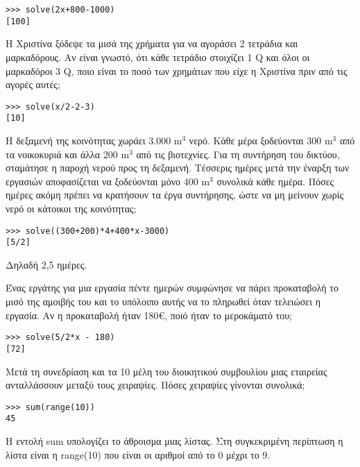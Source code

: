 \begin{lstlisting}
>>> solve(2x+800-1000)
[100]
\end{lstlisting}
\begin{exercise}
Η Χριστίνα ξόδεψε τα μισά της χρήματα για να αγοράσει 2 τετράδια και μαρκαδόρους.
Αν είναι γνωστό, ότι κάθε τετράδιο στοιχίζει 1 Q και όλοι οι μαρκαδόροι 3 Q, ποιο είναι
το ποσό των χρημάτων που είχε η Χριστίνα πριν από τις αγορές αυτές;
\end{exercise}
\begin{lstlisting}
>>> solve(x/2-2-3)
[10]
\end{lstlisting}
\begin{exercise}
Η δεξαμενή της κοινότητας χωράει 3.000 m$^3$ νερό. Κάθε μέρα ξοδεύονται 300 m$^3$ από
τα νοικοκυριά και άλλα 200 m$^3$ από τις βιοτεχνίες. Για τη συντήρηση του δικτύου,
σταμάτησε η παροχή νερού προς τη δεξαμενή. Τέσσερις ημέρες μετά την έναρξη των
εργασιών αποφασίζεται να ξοδεύονται μόνο 400 m$^3$ συνολικά κάθε ημέρα. Πόσες
ημέρες ακόμη πρέπει να κρατήσουν τα έργα συντήρησης, ώστε να μη μείνουν χωρίς
νερό οι κάτοικοι της κοινότητας;
\end{exercise}
\begin{lstlisting}
>>> solve((300+200)*4+400*x-3000)
[5/2]
\end{lstlisting}
Δηλαδή 2,5 ημέρες.
\begin{exercise}
Ένας εργάτης για μια εργασία πέντε ημερών συμφώνησε να πάρει προκαταβολή το
μισό της αμοιβής του και το υπόλοιπο αυτής να το πληρωθεί όταν τελειώσει η εργασία.
Αν η προκαταβολή ήταν 180€, ποιό ήταν το μεροκάματό του;
\end{exercise}
\begin{lstlisting}
>>> solve(5/2*x - 180)
[72]
\end{lstlisting}

\begin{exercise}
Mετά τη συνεδρίαση και τα 10 μέλη του διοικητικού
συμβουλίου μιας εταιρείας ανταλλάσσουν μεταξύ
τους χειραψίες. Πόσες χειραψίες γίνονται συνολικά;
\end{exercise}
\begin{lstlisting}
>>> sum(range(10))
45
\end{lstlisting}
H εντολή sum υπολογίζει το άθροισμα μιας λίστας. Στη συγκεκριμένη περίπτωση η λίστα είναι η range(10) που είναι οι αριθμοί από το 0 μέχρι το 9.